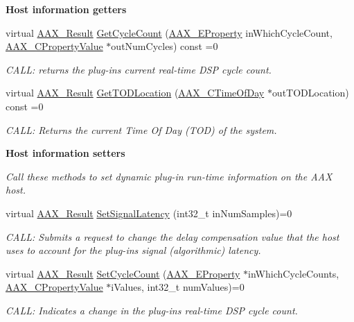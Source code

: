 \begin{Indent}{\bf Host information getters}
\begin{DoxyCompactItemize}
virtual \hyperlink{a00149_a4d8f69a697df7f70c3a8e9b8ee130d2f}{A\+A\+X\+\_\+\+Result} \hyperlink{a00090_a26e009667f9cd6c3cccd45b862108bf4}{Get\+Cycle\+Count} (\hyperlink{a00283_a6571f4e41a5dd06e4067249228e2249e}{A\+A\+X\+\_\+\+E\+Property} in\+Which\+Cycle\+Count, \hyperlink{a00149_ab247c0d8686c14e05cbb567ef276f249}{A\+A\+X\+\_\+\+C\+Property\+Value} $\ast$out\+Num\+Cycles) const =0
\begin{DoxyCompactList}\small\item\em C\+A\+L\+L\+: returns the plug-\/in\textquotesingle{}s current real-\/time D\+S\+P cycle count. \end{DoxyCompactList}\item 
virtual \hyperlink{a00149_a4d8f69a697df7f70c3a8e9b8ee130d2f}{A\+A\+X\+\_\+\+Result} \hyperlink{a00090_afbc2973d755b6c3ae82b6c8461e9fdee}{Get\+T\+O\+D\+Location} (\hyperlink{a00149_a46542a1dcccdcc3b4260a9926edf8a2a}{A\+A\+X\+\_\+\+C\+Time\+Of\+Day} $\ast$out\+T\+O\+D\+Location) const =0
\begin{DoxyCompactList}\small\item\em C\+A\+L\+L\+: Returns the current Time Of Day (T\+O\+D) of the system. \end{DoxyCompactList}\end{DoxyCompactItemize}
\end{Indent}
\begin{Indent}{\bf Host information setters}\par
{\em Call these methods to set dynamic plug-\/in run-\/time information on the A\+A\+X host. }\begin{DoxyCompactItemize}
\item 
virtual \hyperlink{a00149_a4d8f69a697df7f70c3a8e9b8ee130d2f}{A\+A\+X\+\_\+\+Result} \hyperlink{a00090_af2c648879419d94971c1308d8698601f}{Set\+Signal\+Latency} (int32\+\_\+t in\+Num\+Samples)=0
\begin{DoxyCompactList}\small\item\em C\+A\+L\+L\+: Submits a request to change the delay compensation value that the host uses to account for the plug-\/in\textquotesingle{}s signal (algorithmic) latency. \end{DoxyCompactList}\item 
virtual \hyperlink{a00149_a4d8f69a697df7f70c3a8e9b8ee130d2f}{A\+A\+X\+\_\+\+Result} \hyperlink{a00090_a1a654f682357d48bafd506cbbea2ae25}{Set\+Cycle\+Count} (\hyperlink{a00283_a6571f4e41a5dd06e4067249228e2249e}{A\+A\+X\+\_\+\+E\+Property} $\ast$in\+Which\+Cycle\+Counts, \hyperlink{a00149_ab247c0d8686c14e05cbb567ef276f249}{A\+A\+X\+\_\+\+C\+Property\+Value} $\ast$i\+Values, int32\+\_\+t num\+Values)=0
\begin{DoxyCompactList}\small\item\em C\+A\+L\+L\+: Indicates a change in the plug-\/in\textquotesingle{}s real-\/time D\+S\+P cycle count. \end{DoxyCompactList}\end{DoxyCompactItemize}
\end{Indent}
